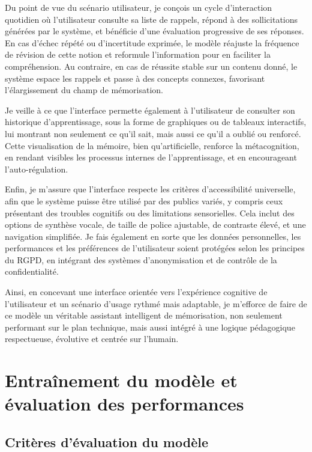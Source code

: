 \documentclass[11pt,a4paper]{report}
\begin{document}
Du point de vue du scénario utilisateur, je conçois un cycle d’interaction quotidien où l’utilisateur consulte sa liste de rappels, répond à des sollicitations générées par le système, et bénéficie d’une évaluation progressive de ses réponses. En cas d’échec répété ou d’incertitude exprimée, le modèle réajuste la fréquence de révision de cette notion et reformule l’information pour en faciliter la compréhension. Au contraire, en cas de réussite stable sur un contenu donné, le système espace les rappels et passe à des concepts connexes, favorisant l’élargissement du champ de mémorisation.

Je veille à ce que l’interface permette également à l’utilisateur de consulter son historique d’apprentissage, sous la forme de graphiques ou de tableaux interactifs, lui montrant non seulement ce qu’il sait, mais aussi ce qu’il a oublié ou renforcé. Cette visualisation de la mémoire, bien qu’artificielle, renforce la métacognition, en rendant visibles les processus internes de l’apprentissage, et en encourageant l’auto-régulation.

Enfin, je m’assure que l’interface respecte les critères d’accessibilité universelle, afin que le système puisse être utilisé par des publics variés, y compris ceux présentant des troubles cognitifs ou des limitations sensorielles. Cela inclut des options de synthèse vocale, de taille de police ajustable, de contraste élevé, et une navigation simplifiée. Je fais également en sorte que les données personnelles, les performances et les préférences de l’utilisateur soient protégées selon les principes du RGPD, en intégrant des systèmes d’anonymisation et de contrôle de la confidentialité.

Ainsi, en concevant une interface orientée vers l’expérience cognitive de l’utilisateur et un scénario d’usage rythmé mais adaptable, je m’efforce de faire de ce modèle un véritable assistant intelligent de mémorisation, non seulement performant sur le plan technique, mais aussi intégré à une logique pédagogique respectueuse, évolutive et centrée sur l’humain.

\section{Entraînement du modèle et évaluation des performances}

\subsection{Critères d’évaluation du modèle}
\end{document}
